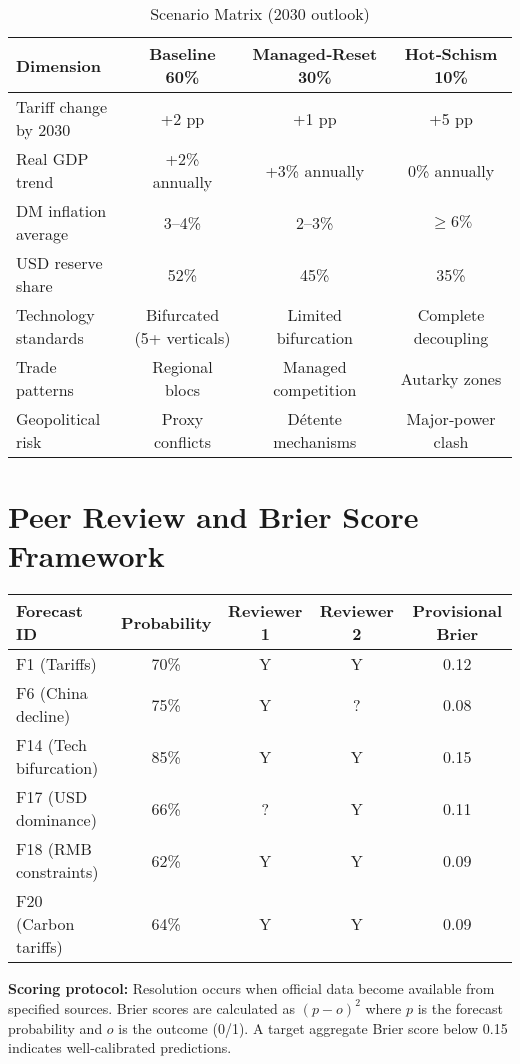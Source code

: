 \documentclass{article}
\begin{document}
\begin{table}[ht]
\centering
\caption*{Scenario Matrix (2030 outlook)}
\small
\begin{tabular}{lccc}
\toprule
\textbf{Dimension} & \textbf{Baseline 60\%} & \textbf{Managed‑Reset 30\%} & \textbf{Hot‑Schism 10\%} \\
\midrule
Tariff change by 2030 & +2 pp & +1 pp & +5 pp \\
Real GDP trend & +2\% annually & +3\% annually & 0\% annually \\
DM inflation average & 3–4\% & 2–3\% & $\geq 6\%$ \\
USD reserve share & 52\% & 45\% & 35\% \\
Technology standards & Bifurcated (5+ verticals) & Limited bifurcation & Complete decoupling \\
Trade patterns & Regional blocs & Managed competition & Autarky zones \\
Geopolitical risk & Proxy conflicts & Détente mechanisms & Major‑power clash \\
\bottomrule
\end{tabular}
\end{table}

\section{Peer Review and Brier Score Framework}

\begin{table}[ht]
\centering
\begin{tabular}{|l|c|c|c|c|}
\hline
\textbf{Forecast ID} & \textbf{Probability} & \textbf{Reviewer 1} & \textbf{Reviewer 2} & \textbf{Provisional Brier} \\
\hline
F1 (Tariffs) & 70\% & Y & Y & 0.12 \\
F6 (China decline) & 75\% & Y & ? & 0.08 \\
F14 (Tech bifurcation) & 85\% & Y & Y & 0.15 \\
F17 (USD dominance) & 66\% & ? & Y & 0.11 \\
F18 (RMB constraints) & 62\% & Y & Y & 0.09 \\
F20 (Carbon tariffs) & 64\% & Y & Y & 0.09 \\
\hline
\end{tabular}
\end{table}

\textbf{Scoring protocol:} Resolution occurs when official data become available from specified sources.  Brier scores are calculated as $(p - o)^2$ where $p$ is the forecast probability and $o$ is the outcome (0/1).  A target aggregate Brier score below 0.15 indicates well‑calibrated predictions.
\end{document}
